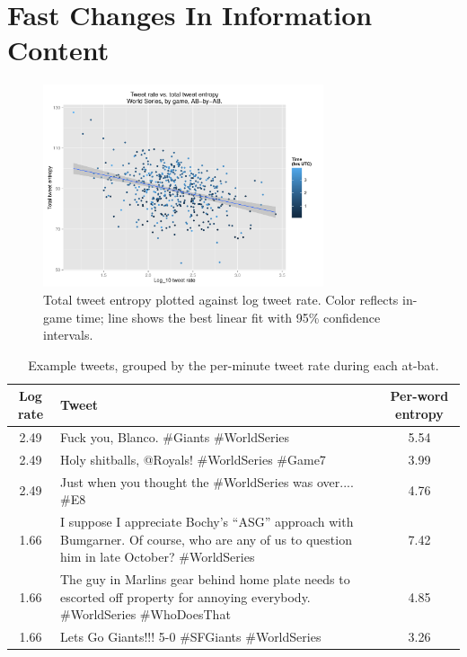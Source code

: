 \documentclass[11pt,letterpaper]{article}
\begin{document}
\section{Fast Changes In Information Content}

\begin{figure}
 \centering
  \includegraphics[width=3.25in]{figures/rate-total-ent-agg}
 \caption{Total tweet entropy plotted against log tweet rate. Color reflects in-game time; line shows the best linear fit with 95\% confidence intervals.}\label{fig:time-perword-ent}\vspace*{-.5em}
\end{figure}

\begin{table}
  \begin{tabular}{clc}
Log rate & Tweet & Per-word entropy \\
\hline
2.49 & Fuck you, Blanco. \#Giants \#WorldSeries & 5.54\\
2.49 & Holy shitballs, @Royals! \#WorldSeries \#Game7 & 3.99\\
2.49 & Just when you thought the \#WorldSeries was over.... \#E8 & 4.76\\
\hline
1.66 & \parbox[][6ex][c]{.7\textwidth}{I suppose I appreciate Bochy's ``ASG'' approach with Bumgarner. Of course, who are any of us to question him in late October? \#WorldSeries} & 7.42\\[3pt]
1.66 & \parbox[][6ex][c]{.7\textwidth}{The guy in Marlins gear behind home plate needs to escorted off property for annoying everybody. \#WorldSeries \#WhoDoesThat} & 4.85\\[3pt]
1.66 & Lets Go Giants!!! 5-0  \#SFGiants \#WorldSeries & 3.26\\
\hline
  \end{tabular}
 \caption{Example tweets, grouped by the per-minute tweet rate during each at-bat.}\label{tab:ex2}
\end{table}
\end{document}
